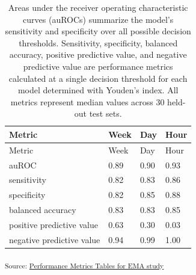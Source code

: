 \documentclass[
]{agujournal2019}
\begin{document}
\label{table-paper}
\begin{longtable}[]{@{}llll@{}}
\caption{Areas under the receiver operating characteristic curves
(auROCs) summarize the model's sensitivity and specificity over all
possible decision thresholds. Sensitivity, specificity, balanced
accuracy, positive predictive value, and negative predictive value are
performance metrics calculated at a single decision threshold for each
model determined with Youden's index. All metrics represent median
values across 30 held-out test sets.}\tabularnewline
\toprule\noalign{}
Metric & Week & Day & Hour \\
\midrule\noalign{}
\endfirsthead
\toprule\noalign{}
Metric & Week & Day & Hour \\
\midrule\noalign{}
\endhead
\bottomrule\noalign{}
\endlastfoot
auROC & 0.89 & 0.90 & 0.93 \\
sensitivity & 0.82 & 0.83 & 0.86 \\
specificity & 0.82 & 0.85 & 0.88 \\
balanced accuracy & 0.83 & 0.83 & 0.85 \\
positive predictive value & 0.63 & 0.30 & 0.03 \\
negative predictive value & 0.94 & 0.99 & 1.00 \\
\end{longtable}

\textsubscript{Source:
\href{https://jjcurtin.github.io/lectures_science/notebooks/ema_tables_metrics-preview.html\#cell-table-paper}{Performance
Metrics Tables for EMA study}}
\end{document}
